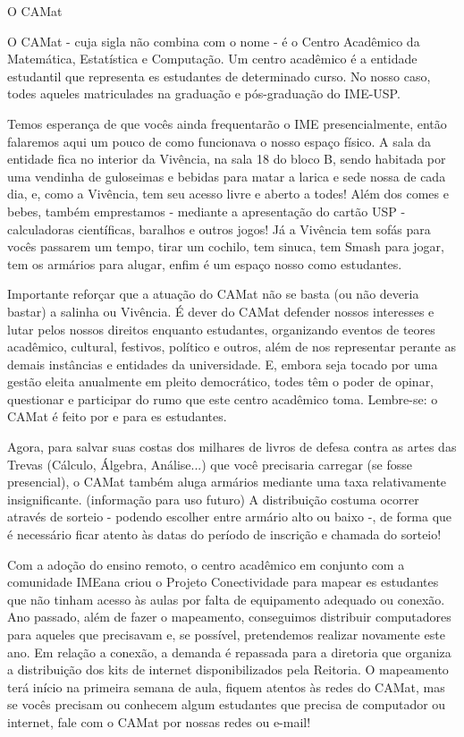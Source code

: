 \begin{secao}{O CAMat}

O CAMat - cuja sigla não combina com o nome - é o Centro Acadêmico da
Matemática, Estatística e Computação.  Um centro acadêmico é a entidade
estudantil que representa es estudantes de determinado curso. No nosso caso,
todes aqueles matriculades na graduação e pós-graduação do IME-USP.

Temos esperança de que vocês ainda frequentarão o IME presencialmente, então
falaremos aqui um pouco de como funcionava o nosso espaço físico. A sala da
entidade fica no interior da Vivência, na sala 18 do bloco B, sendo habitada
por uma vendinha de guloseimas e bebidas para matar a larica e sede nossa de
cada dia, e, como a Vivência, tem seu acesso livre e aberto a todes! Além dos
comes e bebes, também emprestamos - mediante a apresentação do cartão USP -
calculadoras científicas, baralhos e outros jogos! Já a Vivência tem sofás
para vocês passarem um tempo, tirar um cochilo, tem sinuca, tem Smash para jogar,
tem os armários para alugar, enfim é um espaço nosso como estudantes.

Importante reforçar que a atuação do CAMat não se basta (ou não deveria bastar)
a salinha ou Vivência. É dever do CAMat defender nossos interesses e lutar pelos
nossos direitos enquanto estudantes, organizando eventos de teores acadêmico,
cultural, festivos, político e outros, além de nos representar perante as demais
instâncias e entidades da universidade. E, embora seja tocado por uma gestão
eleita anualmente em pleito democrático, todes têm o poder de opinar, questionar
e participar do rumo que este centro acadêmico toma. Lembre-se: o CAMat é feito
por e para es estudantes. 

Agora, para salvar suas costas dos milhares de livros de defesa contra as artes
das Trevas (Cálculo, Álgebra, Análise...) que você precisaria carregar (se fosse
presencial), o CAMat também aluga armários mediante uma taxa relativamente
insignificante. (informação para uso futuro) A distribuição costuma ocorrer
através de sorteio - podendo escolher entre armário alto ou baixo -, de forma
que é necessário ficar atento às datas do período de inscrição e chamada do sorteio!

Com a adoção do ensino remoto, o centro acadêmico em conjunto com a comunidade
IMEana criou o Projeto Conectividade para mapear es estudantes que não tinham
acesso às aulas por falta de equipamento adequado ou conexão. Ano passado, além
de fazer o mapeamento, conseguimos distribuir computadores para aqueles que
precisavam e, se possível, pretendemos realizar novamente este ano. Em relação
a conexão, a demanda é repassada para a diretoria que organiza a distribuição
dos kits de internet disponibilizados pela Reitoria. O mapeamento terá início
na primeira semana de aula, fiquem atentos às redes do CAMat, mas se vocês
precisam ou conhecem algum estudantes que precisa de computador ou internet,
fale com o CAMat por nossas redes ou e-mail!


\end{secao}

